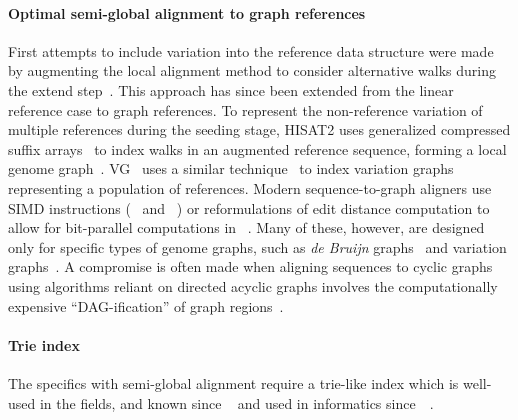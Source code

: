 \paragraph{Optimal semi-global alignment to graph references}
First attempts to include variation into the reference data structure were made
by augmenting the local alignment method to consider alternative walks during
the extend step~\cite{schneeberger_simultaneous_2009,palmapper}. This approach
has since been extended from the linear reference case to graph references. To
represent the non-reference variation of multiple references during the seeding
stage, HISAT2 uses generalized compressed suffix
arrays~\cite{siren_indexing_2014} to index walks in an augmented reference
sequence, forming a local genome graph~\cite{kim_graphbased_2019}.
VG~\cite{garrison_variation_2018} uses a similar
technique~\cite{siren_indexing_2017} to index variation graphs representing a
population of references. Modern sequence-to-graph aligners use SIMD
instructions (\vg~\cite{garrison_variation_2018} and
\pasgal~\cite{jain_accelerating_2019}) or reformulations of edit distance
computation to allow for bit-parallel computations in
\graphaligner~\cite{rautiainen_bitparallel_2019}. Many of these, however, are
designed only for specific types of genome graphs, such as {\itshape de Bruijn}
graphs~\cite{liu_debga_2016,limasset2019toward} and variation
graphs~\cite{garrison_variation_2018}. A compromise is often made when aligning
sequences to cyclic graphs using algorithms reliant on directed acyclic graphs
involves the computationally expensive ``DAG-ification'' of graph
regions~\cite{kavya_sequence_2019,garrison_variation_2018}.

\paragraph{Trie index}
The specifics with semi-global alignment require a trie-like index which is
well-used in the fields, and known since
\citeyear{thue1912gegenseitige}~\cite{thue1912gegenseitige} and used in
informatics since~\citeyear{de1959file}~\cite{de1959file}.